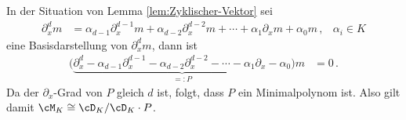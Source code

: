 \begin{prop} \label{prop:Zyklischer-Vektor}
In der Situation von Lemma \ref{lem:Zyklischer-Vektor} sei
\begin{align*}
\partial_x^d m&= \alpha_{d-1}\partial_x^{d-1}m + \alpha_{d-2}\partial_x^{d-2}m
  + \cdots + \alpha_1\partial_xm + \alpha_0m \,, & \alpha_i\in K
\end{align*}
eine Basisdarstellung von $\partial_x^dm$, dann ist
\begin{align*}
\Big( \underset{=:P}{\underbrace{
  \partial_x^d-\alpha_{d-1}\partial_x^{d-1}-\alpha_{d-2}\partial_x^{d-2}
  - \cdots - \alpha_1\partial_x - \alpha_0 }} \Big)m&=0 \,.
\end{align*}
Da der $\partial_x$-Grad von $P$ gleich $d$ ist, folgt, dass $P$ ein
Minimalpolynom ist. Also gilt damit $\cM_K\cong\cD_K/\cD_K\cdot P$.
\end{prop}
\begin{comment}
\begin{prop}
In der Situation von Lemma \ref{lem:Zyklischer-Vektor} gibt es ein $P\in
\cD_K$ mit $\partial$-Grad von $P$ ist gleich $d$ und $P \cdot m=0$, in
diesem Fall ist $P$ ein Minimalpolynom zu $\cM_K$, also gilt
$\cM_K\cong\cD_K/\cD_K\cdot P$. 
\end{prop}
\begin{proof}
Explizit ergibt sich aus der Basisdarstellung
\begin{align*}
\partial_x^d m&= \alpha_{d-1}\partial_x^{d-1}m + \alpha_{d-2}\partial_x^{d-2}m
  + \cdots + \alpha_1\partial_xm + \alpha_0m & \alpha_i\in K
\end{align*}
von $\partial_x^d m$, dass
\[
\cM_K\cong\cD_K/\cD_K\cdot( \underset{=:Q}{\underbrace{
  \partial^d - \alpha_{d-1}\partial_x^{d-1} - \alpha_{d-2}\partial_x^{d-2} -
  \cdots - \alpha_1\partial_x - \alpha_0 }} )
\]
gilt und damit $P:=Q$ so ein Minimalpolynom ist.
\end{proof}
\end{comment}

